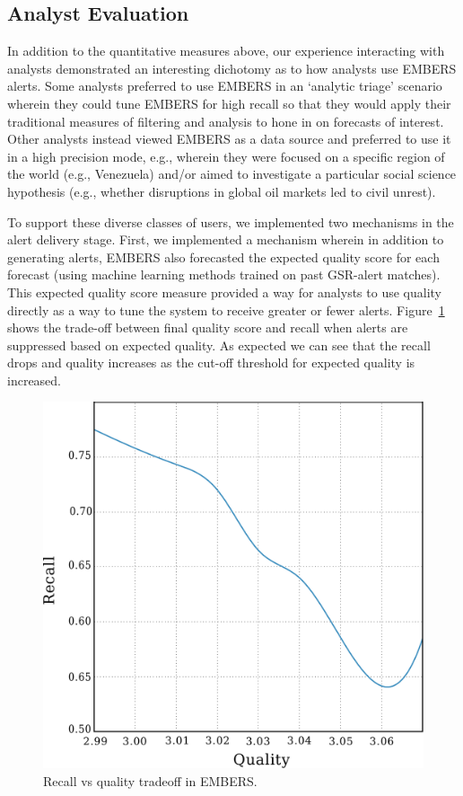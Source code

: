 \subsection{Analyst Evaluation}
In addition to the quantitative measures above, our experience interacting with analysts 
demonstrated
an interesting dichotomy as to how analysts use EMBERS alerts. Some analysts preferred to use EMBERS in an
`analytic triage' scenario wherein they could tune EMBERS for high recall so that they would apply their
traditional measures of filtering and analysis to hone in on forecasts of interest. Other analysts
instead viewed EMBERS as a data source and preferred to use it in a high precision mode, e.g., wherein they
were focused on a specific region of the world (e.g., Venezuela) and/or aimed to investigate a particular
social science hypothesis (e.g., whether disruptions in global oil markets led to civil unrest).

To support these diverse classes of users, we implemented two
mechanisms in the alert delivery stage. First, we implemented a mechanism wherein in addition to generating alerts, EMBERS
also forecasted the expected quality score for each forecast (using machine learning methods trained on
past GSR-alert matches). This expected quality score measure provided a way for analysts to use quality
directly as a way to tune the system to receive greater or fewer
alerts.  Figure~\ref{fig:recallVsQS} shows the trade-off between final quality
score and recall when alerts are suppressed based on expected quality.
As expected we can see that the recall drops and quality increases as
the cut-off threshold for expected quality is increased.
\begin{figure}
\centering
\includegraphics[width=.7\columnwidth]{figures/cu/recallVsQS.pdf}
\caption{Recall vs quality tradeoff in EMBERS.}
\label{fig:recallVsQS}
\end{figure}

